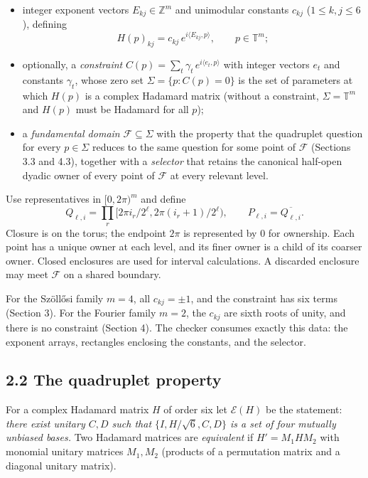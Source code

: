 \documentclass[
  11pt,
]{article}
\providecommand{\tightlist}{%
  \setlength{\itemsep}{0pt}\setlength{\parskip}{0pt}}
\begin{document}
\begin{itemize}
\tightlist
\item
  integer exponent vectors \(E_{kj}\in\mathbb Z^m\) and unimodular
  constants \(c_{kj}\) (\(1\le k,j\le6\)), defining \[
  H(p)_{kj}=c_{kj}\,e^{i\langle E_{kj},p\rangle},\qquad p\in\mathbb T^m ;
  \]
\item
  optionally, a \emph{constraint}
  \(C(p)=\sum_{t}\gamma_t\,e^{i\langle e_t,p\rangle}\) with integer
  vectors \(e_t\) and constants \(\gamma_t\), whose zero set
  \(\Sigma=\{p: C(p)=0\}\) is the set of parameters at which \(H(p)\) is
  a complex Hadamard matrix (without a constraint,
  \(\Sigma=\mathbb T^m\) and \(H(p)\) must be Hadamard for all \(p\));
\item
  a \emph{fundamental domain} \(\mathcal F\subseteq\Sigma\) with the
  property that the quadruplet question for every \(p\in\Sigma\) reduces
  to the same question for some point of \(\mathcal F\) (Sections 3.3
  and 4.3), together with a \emph{selector} that retains the canonical
  half-open dyadic owner of every point of \(\mathcal F\) at every
  relevant level.
\end{itemize}

Use representatives in \([0,2\pi)^m\) and define
\[Q_{\ell,i}=\prod_r[2\pi i_r/2^\ell,2\pi(i_r+1)/2^\ell),\qquad P_{\ell,i}=\overline{Q_{\ell,i}}.\]
Closure is on the torus; the endpoint \(2\pi\) is represented by \(0\)
for ownership. Each point has a unique owner at each level, and its
finer owner is a child of its coarser owner. Closed enclosures are used
for interval calculations. A discarded enclosure may meet \(\mathcal F\)
on a shared boundary.

For the Szöllősi family \(m=4\), all \(c_{kj}=\pm1\), and the constraint
has six terms (Section 3). For the Fourier family \(m=2\), the
\(c_{kj}\) are sixth roots of unity, and there is no constraint (Section
4). The checker consumes exactly this data: the exponent arrays,
rectangles enclosing the constants, and the selector.

\subsection{2.2 The quadruplet property}\label{the-quadruplet-property}

For a complex Hadamard matrix \(H\) of order six let \(\mathcal E(H)\)
be the statement: \emph{there exist unitary \(C,D\) such that
\(\{I,H/\sqrt6,C,D\}\) is a set of four mutually unbiased bases.} Two
Hadamard matrices are \emph{equivalent} if \(H'=M_1HM_2\) with monomial
unitary matrices \(M_1,M_2\) (products of a permutation matrix and a
diagonal unitary matrix).
\end{document}
